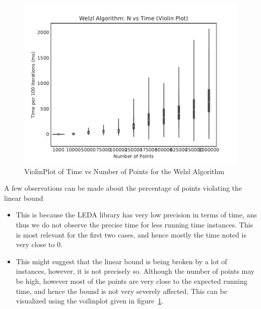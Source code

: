 \documentclass{article}
\begin{document}
\begin{margin}
    \begin{figure}[h!]
        \centering
        \includegraphics{plots/plot-welzl-violin.pdf}
        \caption{ViolinPlot of Time vs Number of Points for the Welzl Algorithm}
        \label{fig:welzl-violin}
    \end{figure}

    A few observations can be made about the percentage of points violating the linear bound

    \begin{itemize}
        \item {} This is because the LEDA library has very low precision in terms of time, ans thus we do not observe the precise time for less running time instances. This is most relevant for the first two cases, and hence mostly the time noted is very close to 0.
        \item {} This might suggest that the linear bound is being broken by a lot of instances, however, it is not precisely so. Although the number of points may be high, however most of the points are very close to the expected running time, and hence the bound is not very severely affected. This can be visualized using the voilinplot given in figure~\ref{fig:welzl-violin}.
    \end{itemize}

\end{margin}
\end{document}
